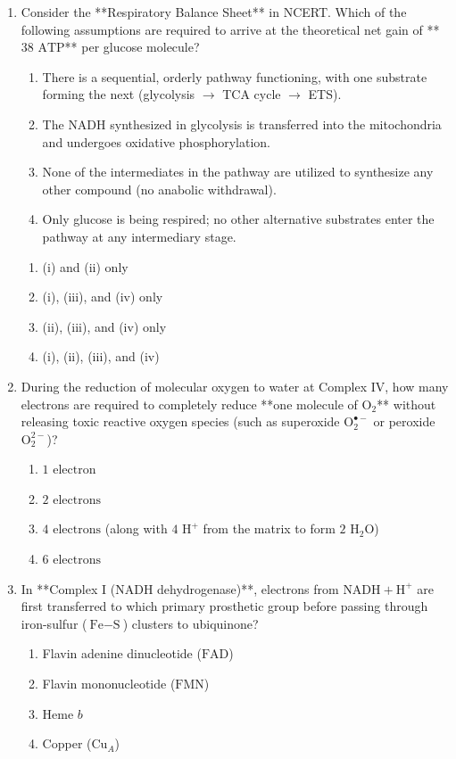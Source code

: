 \documentclass[11pt, a4paper]{article}
\begin{document}
\begin{enumerate}[label=\textbf{\arabic*.}]
\item Consider the **Respiratory Balance Sheet** in NCERT. Which of the following assumptions are required to arrive at the theoretical net gain of **$38\text{ ATP}$** per glucose molecule?
\begin{enumerate}[label=(\roman*)]
    \item There is a sequential, orderly pathway functioning, with one substrate forming the next (glycolysis $\rightarrow$ TCA cycle $\rightarrow$ ETS).
    \item The $\text{NADH}$ synthesized in glycolysis is transferred into the mitochondria and undergoes oxidative phosphorylation.
    \item None of the intermediates in the pathway are utilized to synthesize any other compound (no anabolic withdrawal).
    \item Only glucose is being respired; no other alternative substrates enter the pathway at any intermediary stage.
\end{enumerate}
\begin{enumerate}[label=(\Alph*)]
    \item (i) and (ii) only
    \item (i), (iii), and (iv) only
    \item (ii), (iii), and (iv) only
    \item (i), (ii), (iii), and (iv)
\end{enumerate}

\item During the reduction of molecular oxygen to water at Complex IV, how many electrons are required to completely reduce **one molecule of $\text{O}_2$** without releasing toxic reactive oxygen species (such as superoxide $\text{O}_2^{\bullet-}$ or peroxide $\text{O}_2^{2-}$)?
\begin{enumerate}[label=(\Alph*)]
    \item $1\text{ electron}$
    \item $2\text{ electrons}$
    \item $4\text{ electrons}$ (along with $4\text{ H}^+$ from the matrix to form $2\text{ H}_2\text{O}$)
    \item $6\text{ electrons}$
\end{enumerate}

\item In **Complex I ($\text{NADH}$ dehydrogenase)**, electrons from $\text{NADH} + \text{H}^+$ are first transferred to which primary prosthetic group before passing through iron-sulfur ($\text{Fe}-\text{S}$) clusters to ubiquinone?
\begin{enumerate}[label=(\Alph*)]
    \item Flavin adenine dinucleotide ($\text{FAD}$)
    \item Flavin mononucleotide ($\text{FMN}$)
    \item Heme $b$
    \item Copper ($\text{Cu}_A$)
\end{enumerate}


\end{enumerate}
\end{document}
